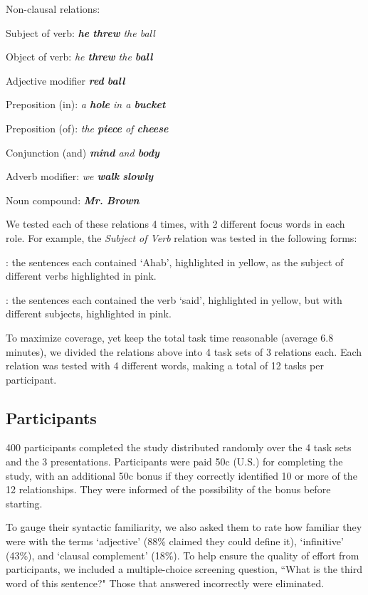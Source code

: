 Non-clausal relations:
\squishlist
	\item Subject of verb: \emph{\textbf{he} \textbf{threw} the ball}
	\item Object of verb:  \emph{ he \textbf{threw} the \textbf{ball}}
	\item Adjective modifier \emph{\textbf{red} \textbf{ball}}
	\item Preposition (in): \emph{a \textbf{hole} in a \textbf{bucket}}
	\item Preposition (of):  \emph{ the \textbf{piece} of \textbf{cheese}}
	\item Conjunction (and)  \emph{ \textbf{mind} and \textbf{body}}
	\item Adverb modifier: \emph{  we \textbf{walk} \textbf{slowly}}
	\item Noun compound:  \emph{ \textbf{Mr.}  \textbf{Brown}}
\squishend

We tested each of these relations 4 times, with 2 different focus words in each role. For example, the \emph{Subject of Verb} relation  was tested in the following forms:
\squishlist
	\item {}:  the sentences each contained `Ahab', highlighted in yellow, as the subject of different verbs highlighted in pink.
	\item {}

	\item {}: the sentences each contained the verb `said', highlighted in yellow, but with different subjects, highlighted in pink.
	\item {}
\squishend

To maximize coverage, yet keep the total task time reasonable (average 6.8 minutes), we divided the relations above into 4 task sets of 3 relations each. Each relation was tested with 4 different words, making a total of 12 tasks per participant.

\subsection{Participants}
400 participants completed the study distributed randomly over the 4 task sets and the 3 presentations. Participants were paid 50c (U.S.) for completing the study, with an additional 50c bonus if they correctly identified 10 or more of the 12 relationships. They were informed of the possibility of the bonus before starting.

 To gauge their syntactic familiarity, we also asked them to rate how familiar they were with the terms `adjective' (88\% claimed they could define it), `infinitive' (43\%), and `clausal complement' (18\%). To help ensure the quality of effort from participants, we included a multiple-choice screening question, ``What is the third word of this sentence?"  Those that answered incorrectly were eliminated.

